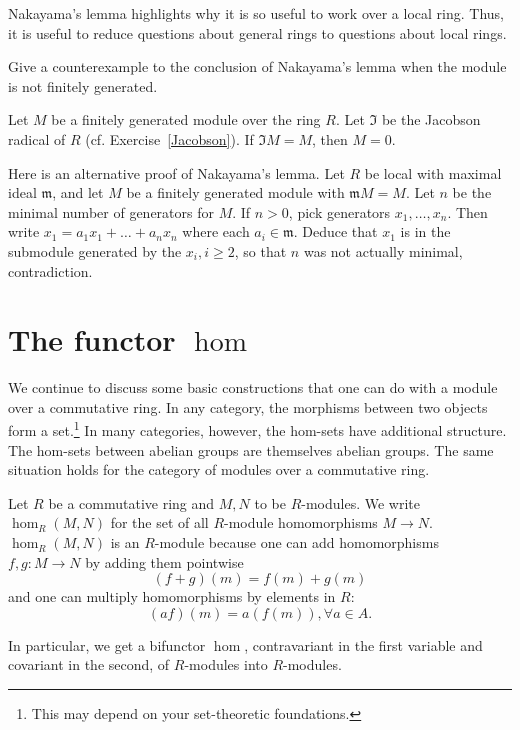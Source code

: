 Nakayama's lemma highlights why it is so useful to work over a local ring.
Thus, it is useful to reduce questions about general rings to questions about
local rings.

\begin{exercise} 
Give a counterexample to the conclusion of Nakayama's lemma when the module is
not finitely generated.
\end{exercise} 
\begin{exercise} 
Let $M$ be a finitely generated module over the ring $R$. Let $\mathfrak{I}$ be the Jacobson
radical of $R$ (cf. Exercise~\ref{Jacobson}). If $\mathfrak{I} M = M$, then $M =
0$.
\end{exercise} 

\begin{exercise} 
Here is an alternative proof of Nakayama's lemma. Let $R$ be local with
maximal ideal $\mathfrak{m}$, and let $M$ be a finitely generated module with
$\mathfrak{m}M = M$. Let $n$ be the minimal number of generators for $M$. If
$n>0$, pick generators $x_1, \dots, x_n$. Then write $x_1 = a_1 x_1 + \dots +
a_n x_n$ where each $a_i \in \mathfrak{m}$. Deduce that $x_1$ is in the
submodule generated by the $x_i, i \geq 2$, so that $n$ was not actually
minimal, contradiction. 
\end{exercise} 
\section{The functor $\hom$}
We continue to  discuss some basic constructions that one can do with a module over a
commutative ring. In any category, the morphisms between two objects form a
set.\footnote{This may depend on your set-theoretic foundations.} In many
categories, however, the hom-sets have additional structure. The hom-sets
between abelian groups are themselves abelian groups. The same situation holds
for the category of modules over a commutative ring.


\begin{definition} 
Let $R$ be a commutative ring and $M,N$ to be $R$-modules.  We write $\hom_R(M,N)$ for
the set of all $R$-module homomorphisms $M \to N$. 
 $\hom_R(M,N)$ is an $R$-module because one can add homomorphisms $f,g: M
\to N$ by adding
them pointwise
\[ (f+g)(m) = f(m)+g(m)  \]
and one can multiply homomorphisms by elements in $R$:
\[ (af)(m) = a(f(m)), \forall a \in A.  \]
\end{definition} 

In particular, we get a bifunctor $\hom$, contravariant in the first variable
and covariant in the second, of $R$-modules into $R$-modules. 

